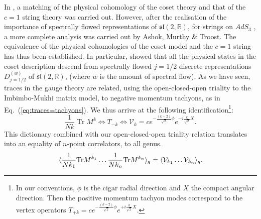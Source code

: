 \documentclass[english]{article}
\DeclareMathOperator{\Tr}{Tr}
\begin{document}
In \cite{MukhiVafa}, a matching of the physical cohomology of the coset theory and that of the $c=1$ string theory was carried out. However, 
after the realisation of the importance of spectrally flowed representations of $\mathfrak{sl}(2, \mathbb{R})$, for strings on $AdS_3$ \cite{MOOgI}, a more complete analysis was carried out by Ashok, Murthy \& Troost\cite{ashok2006topological}. The equivalence of the physical cohomologies of the coset model and the $c=1$ string has thus been established. In particular, \cite{ashok2006topological} showed that all the physical states in the coset description descend from spectrally flowed $j=1/2$ discrete representations $D^{(w)}_{j=1/2}$ of $\mathfrak{sl}(2,\mathbb{R})$,  (where $w$ is the amount of spectral flow). 
As we have seen, traces in the gauge theory are related, using the open-closed-open triality to the Imbimbo-Mukhi matrix model, to negative momentum tachyons, as in Eq.~(\ref{eq:traces=tachyons}). We thus arrive at the following identification\footnote{In our conventions, $\phi$ is the cigar radial direction and $X$ the compact angular direction. Then the positive momentum tachyon modes correspond to the vertex operators $T_{+k} = c e^{-\frac{(k-2)}{\sqrt{2}}\phi}e^{+i\frac{k}{\sqrt{2}}X}$. }:
\begin{equation}
    \frac{1}{N k} \Tr M^{k} \Leftrightarrow T_{-k} \Leftrightarrow \mathcal{V}_{k} = c e^{-\frac{(k-2)}{\sqrt{2}}\phi}e^{-i\frac{k}{\sqrt{2}}X}.
\end{equation}
This dictionary combined with our open-closed-open triality relation translates into an equality of $n$-point correlators, to all genus. 
\begin{equation}
    \langle\frac{1}{N k_1}{\rm Tr}M^{k_1}\ldots \frac{1}{N k_n}{\rm Tr}M^{k_n} \rangle_g = \langle\mathcal{V}_{k_1}\ldots \mathcal{V}_{k_n}\rangle_g.
\end{equation}
\end{document}
